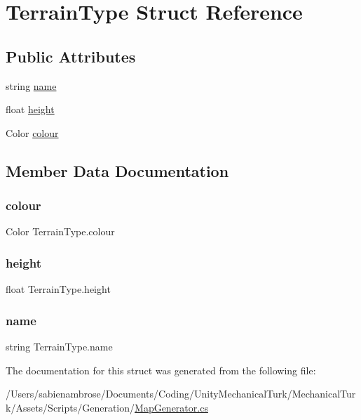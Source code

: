 \hypertarget{struct_terrain_type}{}\section{Terrain\+Type Struct Reference}
\label{struct_terrain_type}
\subsection*{Public Attributes}
\begin{DoxyCompactItemize}
\item 
string \mbox{\hyperlink{struct_terrain_type_ac119720a6896f5caa7c9fa7fad76ea4c}{name}}
\item 
float \mbox{\hyperlink{struct_terrain_type_ad603fa27bc1652ffb7a92ceee8e218a6}{height}}
\item 
Color \mbox{\hyperlink{struct_terrain_type_ada6b1e20a76513d417966f41ebdf3146}{colour}}
\end{DoxyCompactItemize}


\subsection{Member Data Documentation}
\mbox{\label{struct_terrain_type_ada6b1e20a76513d417966f41ebdf3146}} 
\subsubsection{\texorpdfstring{colour}{colour}}
{\footnotesize\ttfamily Color Terrain\+Type.\+colour}

\mbox{\label{struct_terrain_type_ad603fa27bc1652ffb7a92ceee8e218a6}} 
\subsubsection{\texorpdfstring{height}{height}}
{\footnotesize\ttfamily float Terrain\+Type.\+height}

\mbox{\label{struct_terrain_type_ac119720a6896f5caa7c9fa7fad76ea4c}} 
\subsubsection{\texorpdfstring{name}{name}}
{\footnotesize\ttfamily string Terrain\+Type.\+name}



The documentation for this struct was generated from the following file\+:\begin{DoxyCompactItemize}
\item 
/\+Users/sabienambrose/\+Documents/\+Coding/\+Unity\+Mechanical\+Turk/\+Mechanical\+Turk/\+Assets/\+Scripts/\+Generation/\mbox{\hyperlink{_map_generator_8cs}{Map\+Generator.\+cs}}\end{DoxyCompactItemize}
